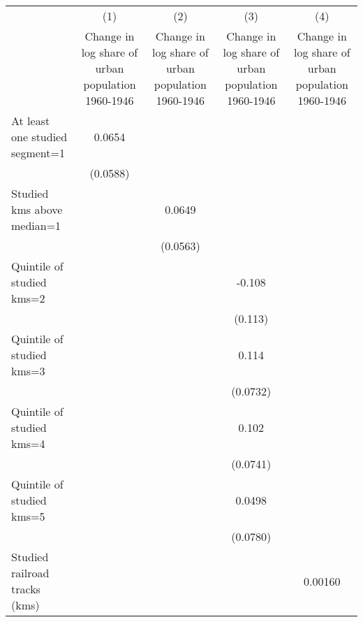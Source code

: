 {
\def\sym#1{\ifmmode^{#1}\else\(^{#1}\)\fi}
\begin{tabular}{l*{4}{c}}
\hline\hline
                    &\multicolumn{1}{c}{(1)}&\multicolumn{1}{c}{(2)}&\multicolumn{1}{c}{(3)}&\multicolumn{1}{c}{(4)}\\
                    &\multicolumn{1}{c}{Change in log share of urban population 1960-1946}&\multicolumn{1}{c}{Change in log share of urban population 1960-1946}&\multicolumn{1}{c}{Change in log share of urban population 1960-1946}&\multicolumn{1}{c}{Change in log share of urban population 1960-1946}\\
\hline
At least one studied segment=1&      0.0654         &                     &                     &                     \\
                    &    (0.0588)         &                     &                     &                     \\
[1em]
Studied kms above median=1&                     &      0.0649         &                     &                     \\
                    &                     &    (0.0563)         &                     &                     \\
[1em]
Quintile of studied kms=2&                     &                     &      -0.108         &                     \\
                    &                     &                     &     (0.113)         &                     \\
[1em]
Quintile of studied kms=3&                     &                     &       0.114         &                     \\
                    &                     &                     &    (0.0732)         &                     \\
[1em]
Quintile of studied kms=4&                     &                     &       0.102         &                     \\
                    &                     &                     &    (0.0741)         &                     \\
[1em]
Quintile of studied kms=5&                     &                     &      0.0498         &                     \\
                    &                     &                     &    (0.0780)         &                     \\
[1em]
Studied railroad tracks (kms)&                     &                     &                     &     0.00160         \\

\end{tabular}}
